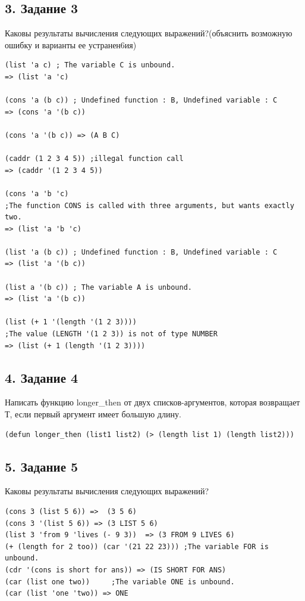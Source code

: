 \subsection*{3. Задание 3}
Каковы результаты вычисления следующих выражений?(объяснить возможную ошибку и варианты ее устранен6ия)

\begin{lstlisting}
(list 'a c) ; The variable C is unbound.
=> (list 'a 'c) 

(cons 'a (b c)) ; Undefined function : B, Undefined variable : C
=> (cons 'a '(b c))

(cons 'a '(b c)) => (A B C)

(caddr (1 2 3 4 5)) ;illegal function call
=> (caddr '(1 2 3 4 5))

(cons 'a 'b 'c) 
;The function CONS is called with three arguments, but wants exactly two.
=> (list 'a 'b 'c)

(list 'a (b c)) ; Undefined function : B, Undefined variable : C
=> (list 'a '(b c))

(list a '(b c)) ; The variable A is unbound.
=> (list 'a '(b c))

(list (+ 1 '(length '(1 2 3)))) 
;The value (LENGTH '(1 2 3)) is not of type NUMBER
=> (list (+ 1 (length '(1 2 3))))
\end{lstlisting}

\subsection*{4. Задание 4}
Написать функцию longer\_then от двух списков-аргументов, которая возвращает Т, если первый аргумент имеет большую длину.
\begin{lstlisting}
(defun longer_then (list1 list2) (> (length list 1) (length list2)))
\end{lstlisting}

\subsection*{5. Задание 5}
Каковы результаты вычисления следующих выражений?
\begin{lstlisting}
(cons 3 (list 5 6)) =>	(3 5 6)
(cons 3 '(list 5 6)) => (3 LIST 5 6)
(list 3 'from 9 'lives (- 9 3))	 => (3 FROM 9 LIVES 6)
(+ (length for 2 too)) (car '(21 22 23))) ;The variable FOR is unbound.
(cdr '(cons is short for ans)) => (IS SHORT FOR ANS)
(car (list one two))	 ;The variable ONE is unbound.
(car (list 'one 'two)) => ONE
\end{lstlisting}

